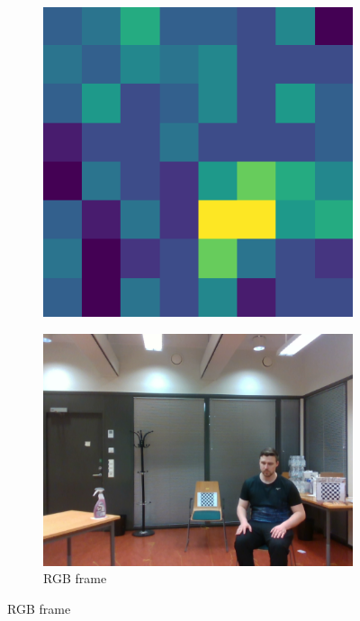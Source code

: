 \begin{figure}
    \centering
    \begin{subfigure}[t]{0.3\textwidth}
        \includegraphics[width=\textwidth]{fig/5/ir_t_53.0.png}
    \end{subfigure}
    \hfill
    \begin{subfigure}[t]{0.3\textwidth}
        \includegraphics[width=\textwidth]{fig/5/rgb_t_53.0.png}
        \caption{RGB frame}

\end{subfigure}
\end{figure}
